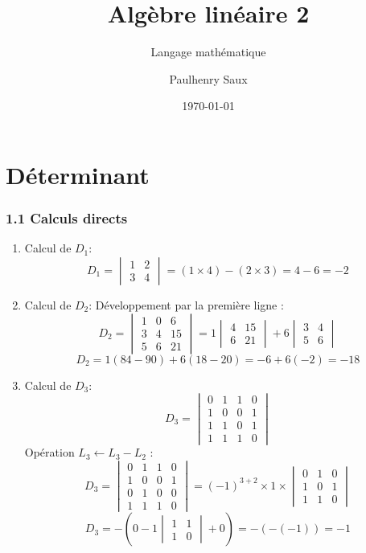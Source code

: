 \documentclass[french]{yLectureNote}
\title{Algèbre linéaire 2}
\subtitle{Langage mathématique}
\author{Paulhenry Saux}
\date{\today}
\begin{document}
\chapter{Déterminant}

\subsection{1.1 Calculs directs}

\begin{enumerate}
    \item Calcul de $D_{1}$:
    $$D_{1}=\begin{vmatrix}1&2\\ 3&4\end{vmatrix} = (1 \times 4) - (2 \times 3) = 4 - 6 = -2$$

    \item Calcul de $D_{2}$:
    Développement par la première ligne :
    $$D_{2}=\begin{vmatrix}1&0&6\\ 3&4&15\\ 5&6&21\end{vmatrix} = 1 \begin{vmatrix}4&15\\ 6&21\end{vmatrix} + 6 \begin{vmatrix}3&4\\ 5&6\end{vmatrix}$$
    $$D_{2} = 1(84 - 90) + 6(18 - 20) = -6 + 6(-2) = -18$$

    \item Calcul de $D_{3}$:
    $$D_{3}=\begin{vmatrix}0&1&1&0\\ 1&0&0&1\\ 1&1&0&1\\ 1&1&1&0\end{vmatrix}$$
    Opération $L_3 \leftarrow L_3 - L_2$ :
    $$D_{3} = \begin{vmatrix}0&1&1&0\\ 1&0&0&1\\ 0&1&0&0\\ 1&1&1&0\end{vmatrix} = (-1)^{3+2} \times 1 \times \begin{vmatrix}0&1&0\\ 1&0&1\\ 1&1&0\end{vmatrix}$$
    $$D_{3} = - \left( 0 - 1 \begin{vmatrix}1&1\\ 1&0\end{vmatrix} + 0 \right) = -(-(-1)) = -1$$


\end{enumerate}
\end{document}
